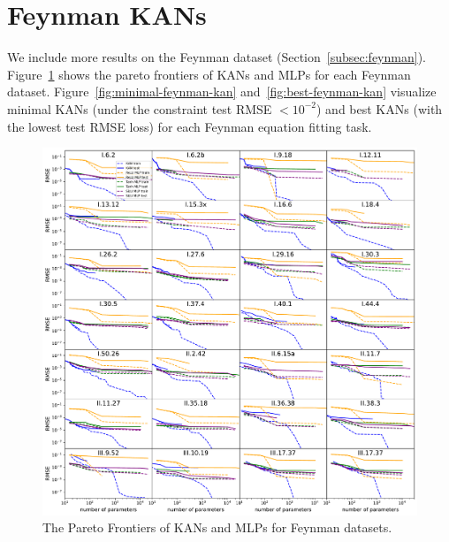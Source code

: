 \documentclass{article}
\numberwithin{equation}{section}
\numberwithin{figure}{section}
\begin{document}
\section{Feynman KANs}\label{app:feynman_kans}

We include more results on the Feynman dataset (Section~\ref{subsec:feynman}). Figure~\ref{fig:feynman_pf} shows the pareto frontiers of KANs and MLPs for each Feynman dataset. Figure~\ref{fig:minimal-feynman-kan} and~\ref{fig:best-feynman-kan} visualize minimal KANs (under the constraint test RMSE $<10^{-2}$) and best KANs (with the lowest test RMSE loss) for each Feynman equation fitting task.

\begin{figure}[t]
    \centering
    \includegraphics[width=1\linewidth]{./figs/feynman_pf.pdf}
    \caption{The Pareto Frontiers of KANs and MLPs for Feynman datasets.}
    \label{fig:feynman_pf}
\end{figure}
\end{document}
